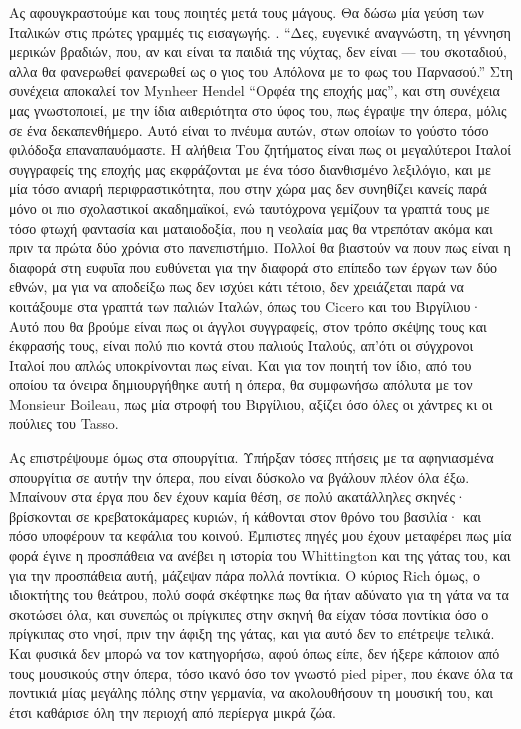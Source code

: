 Ας αφουγκραστούμε και τους ποιητές μετά τους μάγους. Θα δώσω μία γεύση των Ιταλικών στις πρώτες γραμμές τις εισαγωγής. . \enquote{Δες, ευγενικέ αναγνώστη, τη γέννηση μερικών βραδιών, που, αν και είναι τα παιδιά της νύχτας, δεν είναι --- του σκοταδιού, αλλα θα φανερωθεί φανερωθεί ως ο γιος του Απόλονα με το φως του Παρνασού.} Στη συνέχεια αποκαλεί τον Mynheer Hendel \enquote{Ορφέα της εποχής μας}, και στη συνέχεια μας γνωστοποιεί, με την ίδια αιθεριότητα στο ύφος του, πως έγραψε την όπερα, μόλις σε ένα δεκαπενθήμερο. Αυτό είναι το πνέυμα αυτών, στων οποίων το γούστο τόσο φιλόδοξα επαναπαυόμαστε. Η αλήθεια Του ζητήματος είναι πως οι μεγαλύτεροι Ιταλοί συγγραφείς της εποχής μας εκφράζονται με ένα τόσο διανθισμένο λεξιλόγιο, και με μία τόσο ανιαρή περιφραστικότητα, που στην χώρα μας δεν συνηθίζει κανείς παρά μόνο οι πιο σχολαστικοί ακαδημαϊκοί, ενώ ταυτόχρονα γεμίζουν τα γραπτά τους με τόσο φτωχή φαντασία και ματαιοδοξία, που η νεολαία μας θα ντρεπόταν ακόμα και πριν τα πρώτα δύο χρόνια στο πανεπιστήμιο. Πολλοί θα βιαστούν να πουν πως είναι η διαφορά στη ευφυΐα που ευθύνεται για την διαφορά στο επίπεδο των έργων των δύο εθνών, μα για να αποδείξω πως δεν ισχύει κάτι τέτοιο, δεν χρειάζεται παρά να κοιτάξουμε στα γραπτά των παλιών Ιταλών, όπως του Cicero και του Βιργίλιου· Αυτό που θα βρούμε είναι πως οι άγγλοι συγγραφείς, στον τρόπο σκέψης τους και έκφρασής τους, είναι πολύ πιο κοντά στου παλιούς Ιταλούς, απ'ότι οι σύγχρονοι Ιταλοί που απλώς υποκρίνονται πως είναι. Και για τον ποιητή τον ίδιο, από του οποίου τα όνειρα δημιουργήθηκε αυτή η όπερα, θα συμφωνήσω απόλυτα με τον Monsieur Boileau, πως μία στροφή του Βιργίλιου, αξίζει όσο όλες οι χάντρες κι οι πούλιες του Tasso. 

Ας επιστρέψουμε όμως στα σπουργίτια. Υπήρξαν τόσες πτήσεις με τα αφηνιασμένα σπουργίτια σε αυτήν την όπερα, που είναι δύσκολο να βγάλουν πλέον όλα έξω. Μπαίνουν στα έργα που δεν έχουν καμία θέση, σε πολύ ακατάλληλες σκηνές· βρίσκονται σε κρεβατοκάμαρες κυριών, ή κάθονται στον θρόνο του βασιλία· και πόσο υποφέρουν τα κεφάλια του κοινού. Έμπιστες πηγές μου έχουν μεταφέρει πως μία φορά έγινε η προσπάθεια να ανέβει η ιστορία του Whittington και της γάτας του, και για την προσπάθεια αυτή, μάζεψαν πάρα πολλά ποντίκια. Ο κύριος Rich όμως, ο ιδιοκτήτης του θεάτρου, πολύ σοφά σκέφτηκε πως θα ήταν αδύνατο για τη γάτα να τα σκοτώσει όλα, και συνεπώς οι πρίγκιπες στην σκηνή θα είχαν τόσα ποντίκια όσο ο πρίγκιπας στο νησί, πριν την άφιξη της γάτας, και για αυτό δεν το επέτρεψε τελικά. Και φυσικά δεν μπορώ να τον κατηγορήσω, αφού όπως είπε, δεν ήξερε κάποιον από τους μουσικούς στην όπερα, τόσο ικανό όσο τον γνωστό pied piper, που έκανε όλα τα ποντικιά μίας μεγάλης πόλης στην γερμανία, να ακολουθήσουν τη μουσική του, και έτσι καθάρισε όλη την περιοχή από περίεργα μικρά ζώα.

